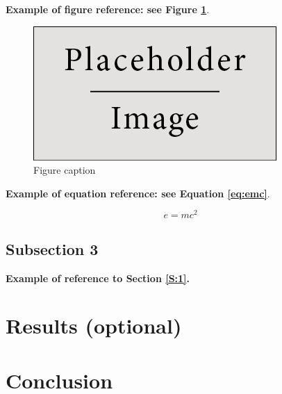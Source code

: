 \documentclass{article}
\begin{document}
        \textbf{Example of figure reference: see Figure \ref{fig:example}}. 
        \lipsum[5]

        \begin{figure}[H]
            \centering\includegraphics[width=0.4\linewidth]{figures/placeholder.jpg}
            \caption{Figure caption}
            \label{fig:example}
        \end{figure}

        \textbf{Example of equation reference: see Equation \eqref{eq:emc}}. 
        \lipsum[6]

        \begin{equation} 
            \label{eq:emc}
            e = mc^2
        \end{equation}

    \subsection{Subsection 3}

        \textbf{Example of reference to Section \ref{S:1}.} 
        \lipsum[7]
        \lipsum[8]



\section{Results (optional)}

    \lipsum[9]

\section{Conclusion}

    \lipsum[10]
    \begin{proposition}
        \lipsum[11]
    \end{proposition}

{}

\end{document}
